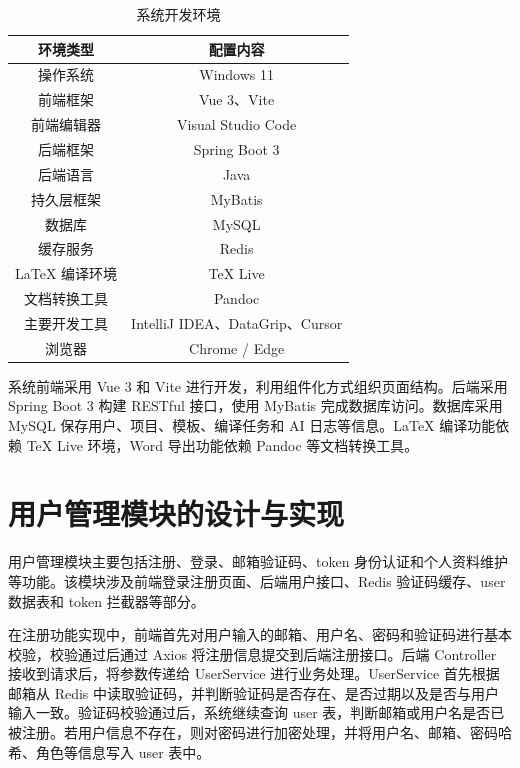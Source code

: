\documentclass{xduugthesis}
\begin{document}
\begin{table}[!ht]
    \centering
    \caption{系统开发环境}
    \label{tab:development-environment}
    \begin{tabular}{|c|c|}
        \hline
        \textbf{环境类型} & \textbf{配置内容} \\ \hline
        操作系统 & Windows 11 \\ \hline
        前端框架 & Vue 3、Vite \\ \hline
        前端编辑器 & Visual Studio Code \\ \hline
        后端框架 & Spring Boot 3 \\ \hline
        后端语言 & Java \\ \hline
        持久层框架 & MyBatis \\ \hline
        数据库 & MySQL \\ \hline
        缓存服务 & Redis \\ \hline
        \LaTeX{} 编译环境 & TeX Live \\ \hline
        文档转换工具 & Pandoc \\ \hline
        主要开发工具 & IntelliJ IDEA、DataGrip、Cursor \\ \hline
        浏览器 & Chrome / Edge \\ \hline
    \end{tabular}
\end{table}

系统前端采用 Vue 3 和 Vite 进行开发，利用组件化方式组织页面结构。后端采用 Spring Boot 3 构建 RESTful 接口，使用 MyBatis 完成数据库访问。数据库采用 MySQL 保存用户、项目、模板、编译任务和 AI 日志等信息。LaTeX 编译功能依赖 TeX Live 环境，Word 导出功能依赖 Pandoc 等文档转换工具。

\section{用户管理模块的设计与实现}
用户管理模块主要包括注册、登录、邮箱验证码、token 身份认证和个人资料维护等功能。该模块涉及前端登录注册页面、后端用户接口、Redis 验证码缓存、user 数据表和 token 拦截器等部分。

在注册功能实现中，前端首先对用户输入的邮箱、用户名、密码和验证码进行基本校验，校验通过后通过 Axios 将注册信息提交到后端注册接口。后端 Controller 接收到请求后，将参数传递给 UserService 进行业务处理。UserService 首先根据邮箱从 Redis 中读取验证码，并判断验证码是否存在、是否过期以及是否与用户输入一致。验证码校验通过后，系统继续查询 user 表，判断邮箱或用户名是否已被注册。若用户信息不存在，则对密码进行加密处理，并将用户名、邮箱、密码哈希、角色等信息写入 user 表中。
\end{document}
